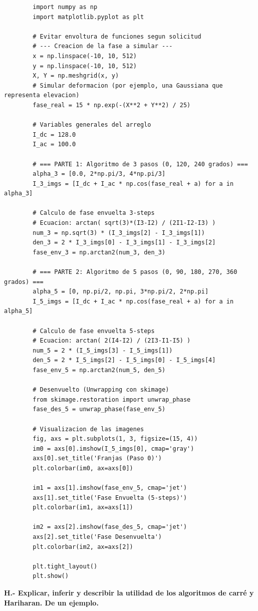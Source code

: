 \documentclass[12pt,letterpaper]{article}
\begin{document}
	\begin{lstlisting}
		import numpy as np
		import matplotlib.pyplot as plt
		
		# Evitar envoltura de funciones segun solicitud
		# --- Creacion de la fase a simular ---
		x = np.linspace(-10, 10, 512)
		y = np.linspace(-10, 10, 512)
		X, Y = np.meshgrid(x, y)
		# Simular deformacion (por ejemplo, una Gaussiana que representa elevacion)
		fase_real = 15 * np.exp(-(X**2 + Y**2) / 25)
		
		# Variables generales del arreglo
		I_dc = 128.0
		I_ac = 100.0
		
		# === PARTE 1: Algoritmo de 3 pasos (0, 120, 240 grados) ===
		alpha_3 = [0.0, 2*np.pi/3, 4*np.pi/3]
		I_3_imgs = [I_dc + I_ac * np.cos(fase_real + a) for a in alpha_3]
		
		# Calculo de fase envuelta 3-steps
		# Ecuacion: arctan( sqrt(3)*(I3-I2) / (2I1-I2-I3) )
		num_3 = np.sqrt(3) * (I_3_imgs[2] - I_3_imgs[1])
		den_3 = 2 * I_3_imgs[0] - I_3_imgs[1] - I_3_imgs[2]
		fase_env_3 = np.arctan2(num_3, den_3)
		
		# === PARTE 2: Algoritmo de 5 pasos (0, 90, 180, 270, 360 grados) ===
		alpha_5 = [0, np.pi/2, np.pi, 3*np.pi/2, 2*np.pi]
		I_5_imgs = [I_dc + I_ac * np.cos(fase_real + a) for a in alpha_5]
		
		# Calculo de fase envuelta 5-steps
		# Ecuacion: arctan( 2(I4-I2) / (2I3-I1-I5) )
		num_5 = 2 * (I_5_imgs[3] - I_5_imgs[1])
		den_5 = 2 * I_5_imgs[2] - I_5_imgs[0] - I_5_imgs[4]
		fase_env_5 = np.arctan2(num_5, den_5)
		
		# Desenvuelto (Unwrapping con skimage)
		from skimage.restoration import unwrap_phase
		fase_des_5 = unwrap_phase(fase_env_5)
		
		# Visualizacion de las imagenes
		fig, axs = plt.subplots(1, 3, figsize=(15, 4))
		im0 = axs[0].imshow(I_5_imgs[0], cmap='gray')
		axs[0].set_title('Franjas (Paso 0)')
		plt.colorbar(im0, ax=axs[0])
		
		im1 = axs[1].imshow(fase_env_5, cmap='jet')
		axs[1].set_title('Fase Envuelta (5-steps)')
		plt.colorbar(im1, ax=axs[1])
		
		im2 = axs[2].imshow(fase_des_5, cmap='jet')
		axs[2].set_title('Fase Desenvuelta')
		plt.colorbar(im2, ax=axs[2])
		
		plt.tight_layout()
		plt.show()
	\end{lstlisting}
	
	\vspace{0.8cm}
	\noindent \textbf{H.- Explicar, inferir y describir la utilidad de los algoritmos de carré y Hariharan. De un ejemplo.}
	
\end{document}
